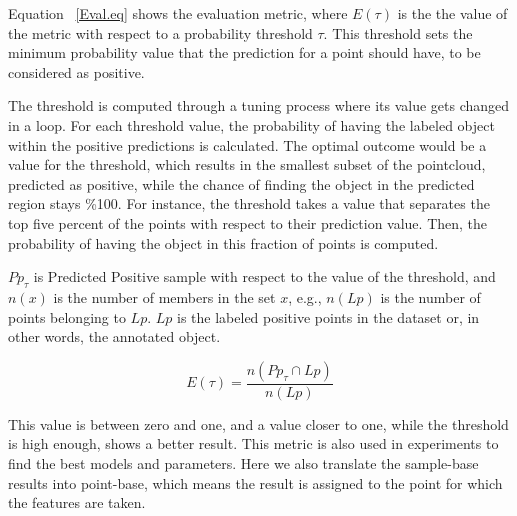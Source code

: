 Equation ~\ref{Eval.eq} shows the evaluation metric, where $E(\tau)$ is the the value of the metric with respect to a 
probability threshold $\tau$. 
This threshold sets the minimum probability value that the prediction for a point should have, to be considered as positive. 

The threshold is computed through a tuning process where its value gets changed in a loop. For each threshold value, the probability of having the labeled object within the positive predictions is calculated. The optimal outcome would be a value for the threshold, which results in the smallest subset of the pointcloud, predicted as positive, while the chance of finding the object in the predicted region stays \%100. For instance, the threshold takes a value that separates the top five percent of the points with respect to their prediction value. Then, the probability of having the object in this fraction of points is computed.


$Pp_{\tau}$ is Predicted Positive sample with respect to the value of the threshold, and $n(x)$ is the number of 
members in the set $x$, e.g., $n(Lp)$ is the number of points belonging to $Lp$. $Lp$ is the 
labeled positive points in the dataset or, in other words, the annotated object.

\begin{equation}
 \label{Eval.eq}
    E(\tau) = \frac{n({Pp_{\tau}} \cap {Lp})}{n(Lp)} 
\end{equation}

This value is between zero and one, and a value closer to one, while the threshold is high enough, shows a better result.
This metric is also used in experiments to find the best models and parameters. 
Here we also translate the sample-base results into point-base, which means the result is assigned to the point for which 
the features are taken.




